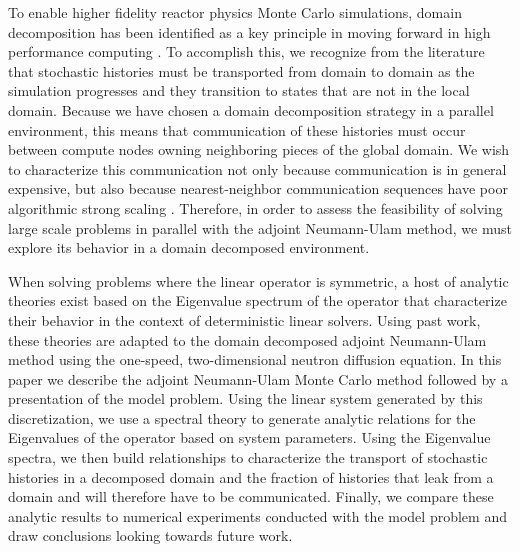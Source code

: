 \documentclass{mc2013}
\begin{document}
To enable higher fidelity reactor physics Monte Carlo simulations,
domain decomposition has been identified as a key principle in moving
forward in high performance computing
\cite{brunner_comparison_2006,siegel_analysis_2012}. To accomplish
this, we recognize from the literature that stochastic histories must
be transported from domain to domain as the simulation progresses and
they transition to states that are not in the local domain. Because we
have chosen a domain decomposition strategy in a parallel environment,
this means that communication of these histories must occur between
compute nodes owning neighboring pieces of the global domain. We wish
to characterize this communication not only because communication is
in general expensive, but also because nearest-neighbor communication
sequences have poor algorithmic strong scaling
\cite{gropp_high-performance_2001}. Therefore, in order to assess the
feasibility of solving large scale problems in parallel with the
adjoint Neumann-Ulam method, we must explore its behavior in a domain
decomposed environment.

When solving problems where the linear operator is symmetric, a host
of analytic theories exist based on the Eigenvalue spectrum of the
operator that characterize their behavior in the context of
deterministic linear solvers. Using past work, these theories are
adapted to the domain decomposed adjoint Neumann-Ulam method using the
one-speed, two-dimensional neutron diffusion equation. In this paper
we describe the adjoint Neumann-Ulam Monte Carlo method followed by a
presentation of the model problem. Using the linear system generated
by this discretization, we use a spectral theory to generate analytic
relations for the Eigenvalues of the operator based on system
parameters. Using the Eigenvalue spectra, we then build relationships
to characterize the transport of stochastic histories in a decomposed
domain and the fraction of histories that leak from a domain and will
therefore have to be communicated. Finally, we compare these analytic
results to numerical experiments conducted with the model problem and
draw conclusions looking towards future work.

\label{sec:adjoint_nu}
\end{document}
